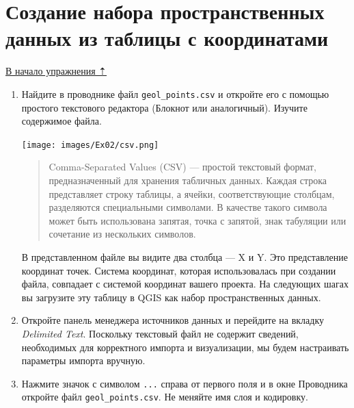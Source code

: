 \documentclass[
  12pt,
]{book}
\begin{document}
\hypertarget{map-design-quaternary-csv}{%
\section{Создание набора пространственных данных из таблицы с координатами}\label{map-design-quaternary-csv}}

\protect\hyperlink{map-design-quaternary}{В начало упражнения ⇡}

\begin{enumerate}
\def\labelenumi{\arabic{enumi}.}
\item
  Найдите в проводнике файл \texttt{geol\_points.csv} и откройте его с помощью простого текстового редактора (Блокнот или аналогичный). Изучите содержимое файла.

  \texttt{[image: images/Ex02/csv.png]}

  \begin{quote}
  Comma-Separated Values (CSV) --- простой текстовый формат, предназначенный для хранения табличных данных. Каждая строка представляет строку таблицы, а ячейки, соответствующие столбцам, разделяются специальными символами. В качестве такого символа может быть использована запятая, точка с запятой, знак табуляции или сочетание из нескольких символов.
  \end{quote}

  В представленном файле вы видите два столбца --- X и Y. Это представление координат точек. Система координат, которая использовалась при создании файла, совпадает с системой координат вашего проекта. На следующих шагах вы загрузите эту таблицу в QGIS как набор пространственных данных.
\item
  Откройте панель менеджера источников данных и перейдите на вкладку \emph{Delimited Text}. Поскольку текстовый файл не содержит сведений, необходимых для корректного импорта и визуализации, мы будем настраивать параметры импорта вручную.
\item
  Нажмите значок с символом \texttt{...} справа от первого поля и в окне Проводника откройте файл \texttt{geol\_points.csv}. Не меняйте имя слоя и кодировку.


\end{enumerate}
\end{document}
